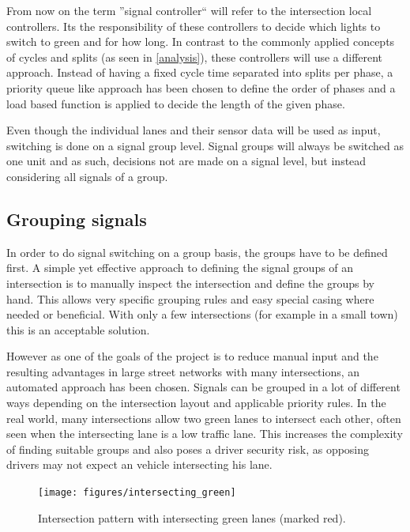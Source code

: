 From now on the term ''signal controller`` will refer to the intersection local controllers. Its the responsibility of these controllers to decide which lights to switch to green and for how long. In contrast to the commonly applied concepts of cycles and splits (as seen in \autoref{analysis}), these controllers will use a different approach. Instead of having a fixed cycle time separated into splits per phase, a priority queue like approach has been chosen to define the order of phases and a load based function is applied to decide the length of the given phase.

Even though the individual lanes and their sensor data will be used as input, switching is done on a signal group level. Signal groups will always be switched as one unit and as such, decisions not are made on a signal level, but instead considering all signals of a group.

\subsection*{Grouping signals}
\label{signal_group_concept}

In order to do signal switching on a group basis, the groups have to be defined first. A simple yet effective approach to defining the signal groups of an intersection is to manually inspect the intersection and define the groups by hand. This allows very specific grouping rules and easy special casing where needed or beneficial. With only a few intersections (for example in a small town) this is an acceptable solution.

However as one of the goals of the project is to reduce manual input and the resulting advantages in large street networks with many intersections, an automated approach has been chosen. Signals can be grouped in a lot of different ways depending on the intersection layout and applicable priority rules. In the real world, many intersections allow two green lanes to intersect each other, often seen when the intersecting lane is a low traffic lane. This increases the complexity of finding suitable groups and also poses a driver security risk, as opposing drivers may not expect an vehicle intersecting his lane.

\begin{figure}[!ht]
	\centering
	\texttt{[image: figures/intersecting\_green]}
	\label{intersecting_green}
	\caption{Intersection pattern with intersecting green lanes (marked red).}
\end{figure}

